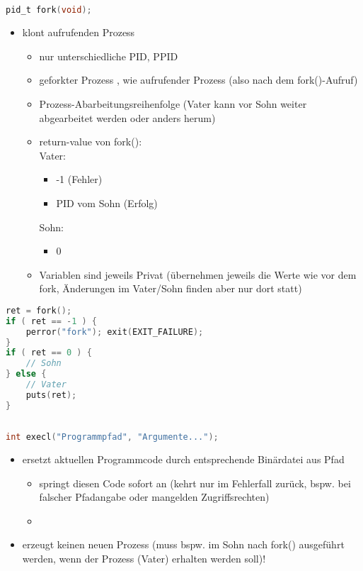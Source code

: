 \subsection[Fork]{}
\begin{lstlisting}[language=C]
pid_t fork(void);
\end{lstlisting}
\begin{itemize}
\item klont aufrufenden Prozess
\begin{itemize}[label=$\to$]
\item nur unterschiedliche PID, PPID
\item geforkter Prozess , wie aufrufender Prozess (also nach dem fork()-Aufruf)
\item Prozess-Abarbeitungsreihenfolge  (Vater kann vor Sohn weiter abgearbeitet werden oder anders herum)
\item return-value von fork():\\
Vater:
\begin{itemize}
\item -1 (Fehler)
\item PID vom Sohn (Erfolg)
\end{itemize}
Sohn:
\begin{itemize}
\item 0
\end{itemize}
\item Variablen sind jeweils Privat (übernehmen jeweils die Werte wie vor dem fork, Änderungen im Vater/Sohn finden aber nur dort statt)
\end{itemize}
\end{itemize}
\begin{lstlisting}[language=C]
ret = fork();
if ( ret == -1 ) {
	perror("fork"); exit(EXIT_FAILURE);
}
if ( ret == 0 ) {
	// Sohn
} else {
	// Vater
	puts(ret);
}
\end{lstlisting}
\subsection[Exec]{}
\begin{lstlisting}[language=C]
int execl("Programmpfad", "Argumente...");
\end{lstlisting}
\begin{itemize}
\item ersetzt aktuellen Programmcode durch entsprechende Binärdatei aus Pfad
\begin{itemize} [label=$\to$]
\item springt diesen Code sofort an (kehrt nur im Fehlerfall zurück, bspw. bei falscher Pfadangabe oder mangelden Zugriffsrechten)
\item {}
\end{itemize}
\item erzeugt keinen neuen Prozess (muss bspw. im Sohn nach fork() ausgeführt werden, wenn der Prozess (Vater) erhalten werden soll)!
\end{itemize}
